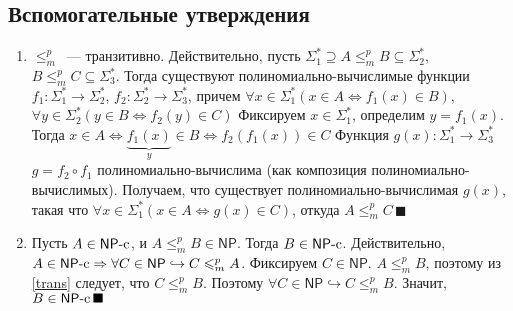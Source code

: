 \documentclass[a4paper]{article}
\def\NP{{\mathsf{NP}}}
\def\NPc{{\mathsf{NP}}\text{-}{\rm c}}
\begin{document}
\subsection*{Вспомогательные утверждения}
\begin{enumerate}
\item \label{trans} $\leqslant_m^p$~--- транзитивно. Действительно, пусть $\Sigma_1^*\supseteq A\leqslant_m^p B\subseteq \Sigma_2^*$, $B\leqslant_m^p C\subseteq\Sigma_3^*$. Тогда существуют полиномиально-вычислимые функции $f_1\colon \Sigma_1^*\to \Sigma_2^*$, $f_2\colon \Sigma_2^*\to \Sigma_3^*$, причем $\forall x\in\Sigma_1^*\left(x\in A\Leftrightarrow f_1(x)\in B\right)$, $\forall y\in \Sigma_2^*\left(y\in B\Leftrightarrow f_2(y)\in C\right)$\newline
Фиксируем $x\in\Sigma_1^*$, определим $y=f_1(x)$. Тогда $x\in A\Leftrightarrow \underbrace{f_1(x)}_y\in B\Leftrightarrow f_2(f_1(x))\in C$\newline
Функция $g(x)\colon \Sigma_1^*\to\Sigma_3^*$ $g=f_2\circ f_1$ полиномиально-вычислима (как композиция полиномиально-вычислимых). Получаем, что существует полиномиально-вычислимая $g(x)$, такая что $\forall x\in\Sigma_1^*\left(x\in A\Leftrightarrow g(x)\in C\right)$, откуда $A\leqslant_m^p C\,\blacksquare$
\item \label{abnpc} Пусть $A\in\NPc$, и $A\leqslant_m^p B\in \NP$. Тогда $B\in \NPc$. Действительно, $A\in\NPc\Rightarrow\forall C\in \NP\hookrightarrow C\leqslant_m^p A$. Фиксируем $C\in\NP$. $A\leqslant_m^p B$, поэтому из \ref{trans} следует, что $C\leqslant_m^p B$. Поэтому $\forall C\in\NP\hookrightarrow C\leqslant_m^p B$. Значит, $B\in\NPc\,\blacksquare$
\end{enumerate}
\end{document}
